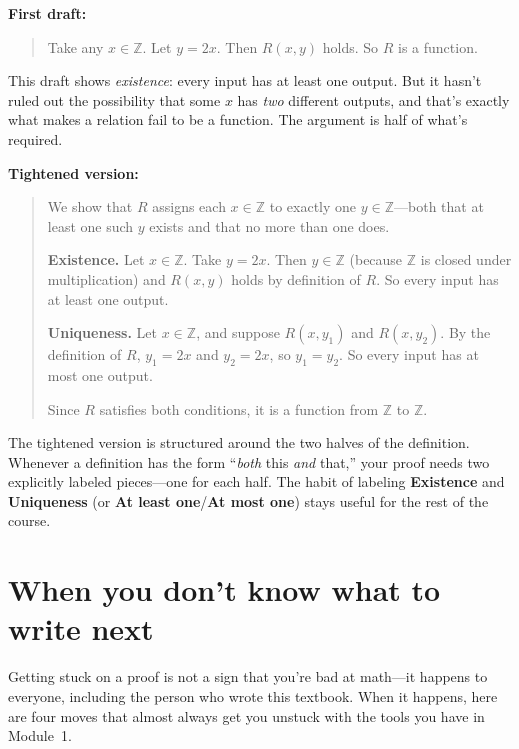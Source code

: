 \documentclass[11pt]{article}
\begin{document}
\medskip
\noindent\textbf{First draft:}
\begin{quote}
Take any $x \in \mathbb{Z}$. Let $y = 2x$. Then $R(x, y)$ holds. So $R$ is a function.
\end{quote}

This draft shows \emph{existence}: every input has at least one output. But it hasn't ruled out the possibility that some $x$ has \emph{two} different outputs, and that's exactly what makes a relation fail to be a function. The argument is half of what's required.

\medskip
\noindent\textbf{Tightened version:}
\begin{quote}
We show that $R$ assigns each $x \in \mathbb{Z}$ to exactly one $y \in \mathbb{Z}$---both that at least one such $y$ exists and that no more than one does.

\smallskip
\textbf{Existence.} Let $x \in \mathbb{Z}$. Take $y = 2x$. Then $y \in \mathbb{Z}$ (because $\mathbb{Z}$ is closed under multiplication) and $R(x, y)$ holds by definition of $R$. So every input has at least one output.

\smallskip
\textbf{Uniqueness.} Let $x \in \mathbb{Z}$, and suppose $R(x, y_1)$ and $R(x, y_2)$. By the definition of $R$, $y_1 = 2x$ and $y_2 = 2x$, so $y_1 = y_2$. So every input has at most one output.

\smallskip
Since $R$ satisfies both conditions, it is a function from $\mathbb{Z}$ to $\mathbb{Z}$.
\end{quote}

The tightened version is structured around the two halves of the definition. Whenever a definition has the form ``\emph{both} this \emph{and} that,'' your proof needs two explicitly labeled pieces---one for each half. The habit of labeling \textbf{Existence} and \textbf{Uniqueness} (or \textbf{At least one}/\textbf{At most one}) stays useful for the rest of the course.

\section{When you don't know what to write next}

Getting stuck on a proof is not a sign that you're bad at math---it happens to everyone, including the person who wrote this textbook. When it happens, here are four moves that almost always get you unstuck with the tools you have in Module~1.
\end{document}

